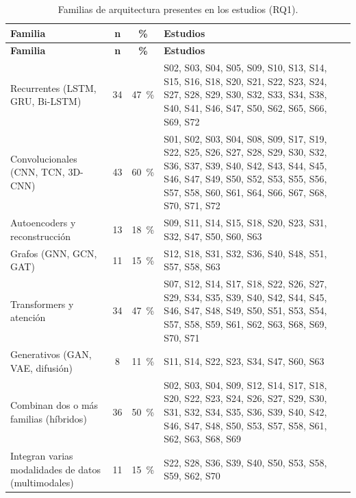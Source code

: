 \begingroup
\small
\begin{xltabular}{\linewidth}{lccX}
\caption{Familias de arquitectura presentes en los estudios (RQ1).}\label{tab:familias}\\
\toprule
\textbf{Familia} & \textbf{n} & \textbf{\%} & \textbf{Estudios} \\
\midrule\endfirsthead
\toprule
\textbf{Familia} & \textbf{n} & \textbf{\%} & \textbf{Estudios} \\
\midrule\endhead
\bottomrule\endfoot
Recurrentes (LSTM, GRU, Bi-LSTM) & 34 & 47~\% & S02, S03, S04, S05, S09, S10, S13, S14, S15, S16, S18, S20, S21, S22, S23, S24, S27, S28, S29, S30, S32, S33, S34, S38, S40, S41, S46, S47, S50, S62, S65, S66, S69, S72 \\
Convolucionales (CNN, TCN, 3D-CNN) & 43 & 60~\% & S01, S02, S03, S04, S08, S09, S17, S19, S22, S25, S26, S27, S28, S29, S30, S32, S36, S37, S39, S40, S42, S43, S44, S45, S46, S47, S49, S50, S52, S53, S55, S56, S57, S58, S60, S61, S64, S66, S67, S68, S70, S71, S72 \\
Autoencoders y reconstrucci\'{o}n & 13 & 18~\% & S09, S11, S14, S15, S18, S20, S23, S31, S32, S47, S50, S60, S63 \\
Grafos (GNN, GCN, GAT) & 11 & 15~\% & S12, S18, S31, S32, S36, S40, S48, S51, S57, S58, S63 \\
Transformers y atenci\'{o}n & 34 & 47~\% & S07, S12, S14, S17, S18, S22, S26, S27, S29, S34, S35, S39, S40, S42, S44, S45, S46, S47, S48, S49, S50, S51, S53, S54, S57, S58, S59, S61, S62, S63, S68, S69, S70, S71 \\
Generativos (GAN, VAE, difusi\'{o}n) & 8 & 11~\% & S11, S14, S22, S23, S34, S47, S60, S63 \\
\midrule
Combinan dos o m\'{a}s familias (h\'{i}bridos) & 36 & 50~\% & S02, S03, S04, S09, S12, S14, S17, S18, S20, S22, S23, S24, S26, S27, S29, S30, S31, S32, S34, S35, S36, S39, S40, S42, S46, S47, S48, S50, S53, S57, S58, S61, S62, S63, S68, S69 \\
Integran varias modalidades de datos (multimodales) & 11 & 15~\% & S22, S28, S36, S39, S40, S50, S53, S58, S59, S62, S70 \\
\end{xltabular}
\endgroup
